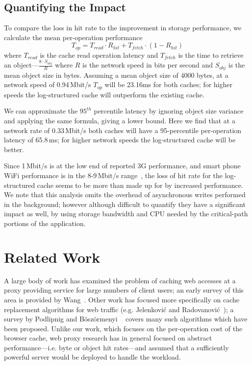 \documentclass[letterpaper,twocolumn,10pt]{article}
\begin{document}
\subsection{Quantifying the Impact}
To compare the loss in hit rate to the improvement in storage performance, we
calculate the mean per-operation performance
\begin{equation}
T_{op} = T_{read}\cdot R_{hit} + T_{fetch}\cdot (1-R_{hit})
\end{equation}
where $T_{read}$ is the cache read operation latency and $T_{fetch}$ is the time
to retrieve an object---$\frac{8\cdot S_{obj}}{R}$ where $R$ is the network
speed in bits per second and $S_{obj}$ is the mean object size in bytes.
Assuming a mean object size of 4000 bytes, at a network speed of 0.94\,Mbit/s
$T_{op}$ will be 23.16ms for both caches; for higher speeds the log-structured
cache will outperform the existing cache.

We can approximate the $95^{th}$ percentile latency by ignoring object size
variance and applying the same formula, giving a lower bound. Here we find that
at a network rate of 0.33\,Mbit/s both caches will have a 95-percentile
per-operation latency of 65.8\,ms; for higher network speeds the log-structured
cache will be better.

Since 1\,Mbit/s is at the low end of reported 3G performance, and smart phone
WiFi performance is in the 8-9\,Mbit/s range~\cite{kim12}, the loss of hit rate
for the log-structured cache seems to be more than made up for by increased
performance. We note that this analysis omits the overhead of asynchronous
writes performed in the background; however although difficult to quantify they
have a significant impact as well, by using storage bandwidth and CPU needed by
the critical-path portions of the application.

\section{Related Work}
A large body of work has examined the problem of caching web accesses at a proxy
providing service for large numbers of client users; an early survey of this
area is provided by Wang~\cite{wang_survey_1999}. Other work has focused more
specifically on cache replacement algorithms for web traffic
(e.g. Jelenkovi\'{c} and Radovanovi\'{c}~\cite{Jelenkovic_optimizing_2004}); a
survey by Podlipnig and B\"{o}sz\"{o}rmenyi ~\cite{podlipnig_survey_2003} covers
many such algorithms which have been proposed. Unlike our work, which focuses on
the per-operation cost of the browser cache, web proxy research has in general
focused on abstract performance---i.e. byte or object hit rates---and assumed
that a sufficiently powerful server would be deployed to handle the workload.
\end{document}
